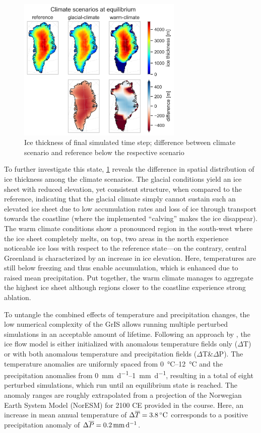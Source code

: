 \begin{figure}
	\centering
	\includegraphics[width=0.7\textwidth]{../climate-anomalies/figs/ice-thickness-maps.png}
	\caption{Ice thickness of final simulated time step; difference between climate scenario and reference below the respective scenario}
	\label{fig:scenarios-thick-maps}
\end{figure}

To further investigate this state, \cref{fig:scenarios-thick-maps} reveals the difference in spatial distribution of ice thickness among the climate scenarios. The glacial conditions yield an ice sheet with reduced elevation, yet consistent structure, when compared to the reference, indicating that the glacial climate simply cannot sustain such an elevated ice sheet due to low accumulation rates and loss of ice through transport towards the coastline (where the implemented \enquote{calving} makes the ice disappear). The warm climate conditions show a pronounced region in the south-west where the ice sheet completely melts, on top, two areas in the north experience noticeable ice loss with respect to the reference state---on the contrary, central Greenland is characterized by an increase in ice elevation. Here, temperatures are still below freezing and thus enable accumulation, which is enhanced due to raised mean precipitation. Put together, the warm climate manages to aggregate the highest ice sheet although regions closer to the coastline experience strong ablation.

To untangle the combined effects of temperature and precipitation changes, the low numerical complexity of the GrIS allows running multiple perturbed simulations in an acceptable amount of lifetime. Following an approach by \textcite{born2019}, the ice flow model is either initialized with anomalous temperature fields only (\(\Delta\text{T}\)) or with both anomalous temperature and precipitation fields (\(\Delta\)T\&\(\Delta\)P). The temperature anomalies are uniformly spaced from \SIrange{0}{12}{\celsius} and the precipitation anomalies from \SIrange{0}{1}{\mm\per\day}, resulting in a total of eight perturbed simulations, which run until an equilibrium state is reached. The anomaly ranges are roughly extrapolated from a projection of the Norwegian Earth System Model (NorESM) for 2100 CE provided in the course. Here, an increase in mean annual temperature of \(\Delta\overline{T} = \SI{3.8}{\celsius}\) corresponds to a positive precipitation anomaly of \(\Delta\mean{P} = \SI{0.2}{\mm\per\day}\). 

